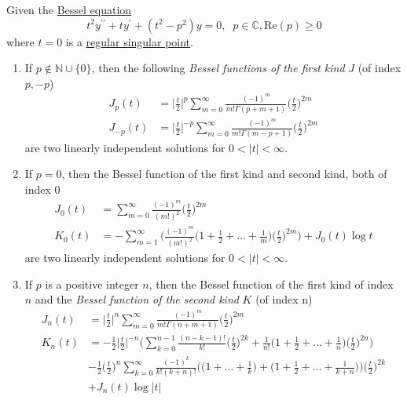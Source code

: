 \documentclass{article}
\newcounter{theorem}[section]
\begin{document}
      \begin{theorem}
        \label{thm:the-bessel-function}
      Given the \hyperref[def:bessel-equation]{Bessel equation} 
      \begin{equation}
        t^2 y^{\prime\prime} + t y^\prime + (t^2 - p^2) y = 0, \;\; p \in \mathbb{C}, \text{Re}(p) \geq 0
      \end{equation}
      where $t = 0$ is a \hyperref[def:regular-singular-point]{regular singular point}. 
      \begin{enumerate}
          \item If $p \not\in \mathbb{N} \cup \{0\}$, then the following \textit{Bessel functions of the first kind} $J$ (of index $p, -p$) 
          \begin{align*}
              J_p (t) & = \bigg| \frac{t}{2}\bigg|^p \sum_{m=0}^\infty \frac{(-1)^m}{m! \Gamma(p+m+1)} \bigg(\frac{t}{2}\bigg)^{2m} \\
              J_{-p} (t) & = \bigg| \frac{t}{2}\bigg|^{-p} \sum_{m=0}^\infty \frac{(-1)^m}{m! \Gamma(m-p+1)} \bigg(\frac{t}{2}\bigg)^{2m}
          \end{align*}
          are two linearly independent solutions for $0 < |t| < \infty$. 
          \item If $p = 0$, then the Bessel function of the first kind and second kind, both of index $0$
          \begin{align*}
              J_0 (t) & = \sum_{m=0}^\infty \frac{(-1)^m}{(m!)^2} \bigg( \frac{t}{2}\bigg)^{2m} \\
              K_0 (t) & = - \sum_{m=1}^\infty \Bigg( \frac{(-1)^m}{(m!)^2} \bigg(1 + \frac{1}{2} + \ldots + \frac{1}{m} \bigg) \bigg(\frac{t}{2}\bigg)^{2m} \Bigg) + J_0 (t) \log{t}
          \end{align*}
          are two linearly independent solutions for $0 < |t|<\infty$. 
          \item If $p$ is a positive integer $n$, then the Bessel function of the first kind of index $n$ and the \textit{Bessel function of the second kind} $K$ (of index n)
          \begin{align*}
              J_n (t) & = \bigg| \frac{t}{2}\bigg|^n \sum_{m=0}^\infty \frac{(-1)^m}{m! \Gamma(n+m+1)} \bigg(\frac{t}{2}\bigg)^{2m} \\
              K_n (t) & = -\frac{1}{2} \bigg|\frac{t}{2}\bigg|^{-n} \bigg(\sum_{k=0}^{n-1} \frac{(n-k-1)!}{k!} \bigg(\frac{t}{2}\bigg)^{2k} + \frac{1}{n!}\bigg(1 + \frac{1}{2} + \ldots + \frac{1}{n}\bigg)\bigg(\frac{t}{2}\bigg)^{2n} \Bigg) \\
              & -\frac{1}{2} \bigg(\frac{t}{2} \bigg)^n \sum_{k=0}^\infty \frac{(-1)^k}{k!(k+n)!} \bigg(\Big(1 + \ldots + \frac{1}{k}\Big) + \Big(1 + \frac{1}{2} + \ldots + \frac{1}{k+n}\Big) \bigg) \bigg(\frac{t}{2}\bigg)^{2k} \\
              & + J_n (t) \log{|t|}
          \end{align*}
      \end{enumerate}
      \end{theorem}
\end{document}
